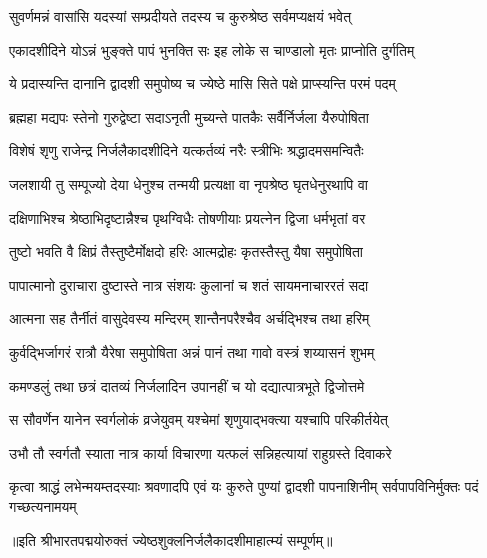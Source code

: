 \twolineshloka
{सुवर्णमन्नं वासांसि यदस्यां सम्प्रदीयते}
{तदस्य च कुरुश्रेष्ठ सर्वमप्यक्षयं भवेत्} %

\twolineshloka
{एकादशीदिने योऽन्नं भुङ्क्ते पापं भुनक्ति सः}
{इह लोके स चाण्डालो मृतः प्राप्नोति दुर्गतिम्} %

\twolineshloka
{ये प्रदास्यन्ति दानानि द्वादशी समुपोष्य च}
{ज्येष्ठे मासि सिते पक्षे प्राप्स्यन्ति परमं पदम्} %

\twolineshloka
{ब्रह्महा मद्यपः स्तेनो गुरुद्वेष्टा सदाऽनृती}
{मुच्यन्ते पातकैः सर्वैर्निर्जला यैरुपोषिता} %

\twolineshloka
{विशेषं शृणु राजेन्द्र निर्जलैकादशीदिने}
{यत्कर्तव्यं नरैः स्त्रीभिः श्रद्धादमसमन्वितैः} %

\twolineshloka
{जलशायी तु सम्पूज्यो देया धेनुश्च तन्मयी}
{प्रत्यक्षा वा नृपश्रेष्ठ घृतधेनुरथापि वा} %

\twolineshloka
{दक्षिणाभिश्च श्रेष्ठाभिदृष्टान्नैश्च पृथग्विधैः}
{तोषणीयाः प्रयत्नेन द्विजा धर्मभृतां वर} %

\twolineshloka
{तुष्टो भवति वै क्षिप्रं तैस्तुष्टैर्मोक्षदो हरिः}
{आत्मद्रोहः कृतस्तैस्तु यैषा समुपोषिता} %

\twolineshloka
{पापात्मानो दुराचारा दुष्टास्ते नात्र संशयः}
{कुलानां च शतं सायमनाचाररतं सदा} %

\twolineshloka
{आत्मना सह तैर्नीतं वासुदेवस्य मन्दिरम्}
{शान्तैनपरैश्चैव अर्चद्भिश्च तथा हरिम्} %

\twolineshloka
{कुर्वद्भिर्जागरं रात्रौ यैरेषा समुपोषिता}
{अन्नं पानं तथा गावो वस्त्रं शय्यासनं शुभम्} %

\twolineshloka
{कमण्डलुं तथा छत्रं दातव्यं निर्जलादिन}
{उपानहीं च यो दद्यात्पात्रभूते द्विजोत्तमे} %

\twolineshloka
{स सौवर्णेन यानेन स्वर्गलोकं व्रजेयुवम्}
{यश्चेमां शृणुयाद्भक्त्या यश्चापि परिकीर्तयेत्} %

\twolineshloka
{उभौ तौ स्वर्गतौ स्याता नात्र कार्या विचारणा}
{यत्फलं सन्निहत्यायां राहुग्रस्ते दिवाकरे} %


\threelineshloka
{कृत्वा श्राद्धं लभेन्मयम्तदस्याः श्रवणादपि}
{एवं यः कुरुते पुण्यां द्वादशी पापनाशिनीम्}
{सर्वपापविनिर्मुक्तः पदं गच्छत्यनामयम्} %

॥इति श्रीभारतपद्मयोरुक्तं ज्येष्ठशुक्लनिर्जलैकादशीमाहात्म्यं सम्पूर्णम्॥


\hyperref[sec:ekadashi_mahatmyam_vrata_raja]{\closesub}
\clearpage

\label{sec:vrata-raja-ashadha-krishna-yogini}

